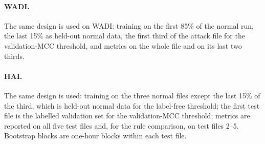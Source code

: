 \documentclass[11pt]{article}
\begin{document}
\paragraph{WADI.} The same design is used on WADI: training on the first 85\% of the
normal run, the last 15\% as held-out normal data, the first third of the attack file
for the validation-MCC threshold, and metrics on the whole file and on its last two
thirds.
\paragraph{HAI.} The same design is used: training on the three normal files except
the last 15\% of the third, which is held-out normal data for the label-free
threshold; the first test file is the labelled validation set for the
validation-MCC threshold; metrics are reported on all five test files and, for the
rule comparison, on test files 2--5. Bootstrap blocks are one-hour blocks within
each test file.
\end{document}
